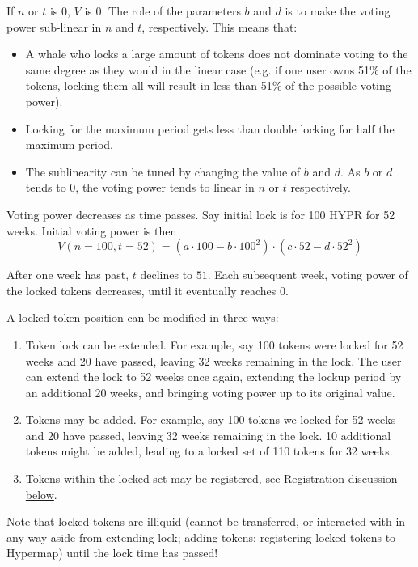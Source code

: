 \documentclass{article}
\begin{document}
If $n$ or $t$ is $0$, $V$ is $0$.
The role of the parameters $b$ and $d$ is to make the voting power sub-linear in $n$ and $t$, respectively.
This means that:
\begin{itemize}
    \item A whale who locks a large amount of tokens does not dominate voting to the same degree as they would in the linear case (e.g. if one user owns 51\% of the tokens, locking them all will result in less than 51\% of the possible voting power).
    \item Locking for the maximum period gets less than double locking for half the maximum period.
    \item The sublinearity can be tuned by changing the value of $b$ and $d$.
      As $b$ or $d$ tends to $0$, the voting power tends to linear in $n$ or $t$ respectively.
\end{itemize}

Voting power decreases as time passes.
Say initial lock is for 100 HYPR for 52 weeks.
Initial voting power is then
\begin{equation}
V(n=100, t=52) = (a\cdot 100 - b\cdot 100^2) \cdot (c\cdot 52 - d\cdot 52^2)
\end{equation}

After one week has past, $t$ declines to $51$.
Each subsequent week, voting power of the locked tokens decreases, until it eventually reaches $0$.

A locked token position can be modified in three ways:
\begin{enumerate}
    \item Token lock can be extended.
       For example, say 100 tokens were locked for 52 weeks and 20 have passed, leaving 32 weeks remaining in the lock.
       The user can extend the lock to 52 weeks once again, extending the lockup period by an additional 20 weeks, and bringing voting power up to its original value.
    \item Tokens may be added.
       For example, say 100 tokens we locked for 52 weeks and 20 have passed, leaving 32 weeks remaining in the lock.
       10 additional tokens might be added, leading to a locked set of 110 tokens for 32 weeks.
    \item Tokens within the locked set may be registered, see \hyperref[sec:registration]{Registration discussion below}.
\end{enumerate}

Note that locked tokens are illiquid (cannot be transferred, or interacted with in any way aside from extending lock; adding tokens; registering locked tokens to Hypermap) until the lock time has passed!
\end{document}
